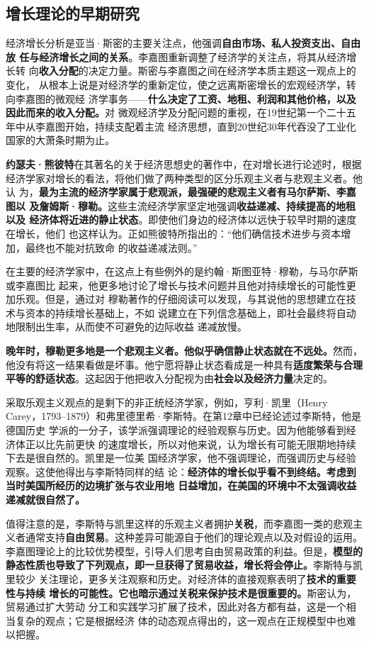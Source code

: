 \subsection{增长理论的早期研究}

经济增长分析是亚当·斯密的主要关注点，他强调\textbf{自由市场、私人投资支出、自由放
  任与经济增长之间的关系}。李嘉图重新调整了经济学的关注点，将其从经济增长转
向\textbf{收入分配}的决定力量。斯密与李嘉图之间在经济学本质主题这一观点上的变化，
从根本上说是对经济学的重新定位，使之远离斯密增长的宏观经济学，转向李嘉图的微观经
济学事务——\textbf{什么决定了工资、地租、利润和其他价格，以及因此而来的收入分配。}对
微观经济学及分配问题的重视，在19世纪第一个二十五年中从李嘉图开始，持续支配着主流
经济思想，直到20世纪30年代吞没了工业化国家的大萧条时期为止。

\textbf{约瑟夫·熊彼特}在其著名的关于经济思想史的著作中，在对增长进行论述时，根据
经济学家对增长的看法，将他们做了两种类型的区分乐观主义者与悲观主义者。他认
为，\textbf{最为主流的经济学家属于悲观派，最强硬的悲观主义者有马尔萨斯、李嘉图以
  及詹姆斯·穆勒。}这些主流经济学家坚定地强调\textbf{收益递减、持续提高的地租以及
  经济体将近进的静止状态}。即使他们身边的经济体以远快于较早时期的速度在增长，他们
也这样认为。正如熊彼特所指出的：“他们确信技术进步与资本增加，最终也不能对抗致命
的收益递减法则。”

在主要的经济学家中，在这点上有些例外的是约翰·斯图亚特·穆勒，与马尔萨斯或李嘉图比
起来，他更多地讨论了增长与技术问题并且他对持续增长的可能性更加乐观。但是，通过对
穆勒著作的仔细阅读可以发现，与其说他的思想建立在技术与资本的持续增长基础上，不如
说建立在下列信念基础上，即社会最终将自动地限制出生率，从而使不可避免的边际收益
递减放慢。

\textbf{晚年时，穆勒更多地是一个悲观主义者。他似乎确信静止状态就在不远处。}然而，
他没有将这一结果看做是坏事。他宁愿将静止状态看成是一种具有\textbf{适度繁荣与合理
  平等的舒适状态}。这起因于他把收入分配视为由\textbf{社会以及经济力量}决定的。

采取乐观主义观点的是剩下的非正统经济学家，例如，亨利·凯里（Henry
Carey，1793--1879）和弗里德里希·李斯特。在第12章中已经论述过李斯特，他是德国历史
学派的一分子，该学派强调理论的经验观察与历史。因为他能够看到经济体正以比先前更快
的速度增长，所以对他来说，认为增长有可能无限期地持续下去是很自然的。凯里是一位美
国经济学家，他不强调理论，而强调历史与经验观察。这使他得出与李斯特同样的结
论：\textbf{经济体的增长似乎看不到终结。考虑到当时美国所经历的边境扩张与农业用地
  日益增加，在美国的环境中不太强调收益递减就很自然了。}

值得注意的是，李斯特与凯里这样的乐观主义者拥护\textbf{关税}，而李嘉图一类的悲观主
义者通常支持\textbf{自由贸易}。这种差异可能源自于他们的理论观点以及对假设的运用。
李嘉图理论上的比较优势模型，引导人们思考自由贸易政策的利益。但是，\textbf{模型的
  静态性质也导致了下列观点，即一旦获得了贸易收益，增长将会停止。}李斯特与凯里较少
关注理论，更多关注观察和历史。对经济体的直接观察表明了\textbf{技术的重要性与持续
  增长的可能性。它也暗示通过关税来保护技术是很重要的。}斯密认为，贸易通过扩大劳动
分工和实践学习扩展了技术，因此对各方都有益，这是一个相当复杂的观点；它是根据经济
体的动态观点得出的，这一观点在正规模型中也难以把握。

